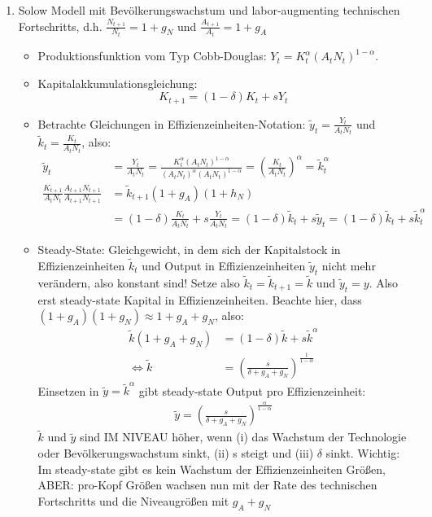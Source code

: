 \documentclass{scrartcl}
\begin{document}
\begin{enumerate}
\item Solow Modell mit Bev\"{o}lkerungswachstum und labor-augmenting technischen Fortschritts, d.h. $\frac{N_{t+1}}{N_t} = 1+g_N$ und $\frac{A_{t+1}}{A_t} = 1+g_A$
\begin{itemize}
  \item Produktionsfunktion vom Typ Cobb-Douglas: $Y_t = K_t^\alpha \left(A_tN_t\right)^{1-\alpha}$.
  \item Kapitalakkumulationsgleichung: $$K_{t+1}=(1-\delta)K_t + s Y_t$$
  \item Betrachte Gleichungen in Effizienzeinheiten-Notation: $\tilde{y}_t = \frac{Y_t}{A_tN_t}$ und $\tilde{k}_t = \frac{K_t}{A_tN_t}$, also:
      \begin{align*}
        \tilde{y}_t &= \frac{Y_t}{A_tN_t} = \frac{K_t^\alpha (A_tN_t)^{1-\alpha}}{(A_tN_t)^\alpha (A_tN_t)^{1-\alpha}} = \left(\frac{K_t}{A_tN_t}\right)^\alpha = \tilde{k}_t^\alpha\\
        \frac{K_{t+1}}{A_{t}N_{t}} \frac{A_{t+1}N_{t+1}}{A_{t+1}N_{t+1}} &= \tilde{k}_{t+1}(1+g_A)(1+h_N)\\ &= (1-\delta)\frac{K_t}{A_{t}N_{t}} + s \frac{Y_t}{A_{t}N_{t}} = (1-\delta)\tilde{k}_t + s \tilde{y}_t = (1-\delta)\tilde{k}_t + s \tilde{k}_t^\alpha
      \end{align*}
  \item Steady-State: Gleichgewicht, in dem sich der Kapitalstock in Effizienzeinheiten $\tilde{k}_t$ und Output in Effizienzeinheiten $\tilde{y}_t$ nicht mehr ver\"{a}ndern, also konstant sind! Setze also $\tilde{k}_t=\tilde{k}_{t+1}=\tilde{k}$ und $\tilde{y}_t=y$. Also erst steady-state Kapital in Effizienzeinheiten. Beachte hier, dass $(1+g_A)(1+g_N) \approx 1+g_A+g_N$, also:
      \begin{align*}
      \tilde{k}(1+g_A+g_N) &= (1-\delta)\tilde{k} + s\tilde{k}^\alpha\\
      \Leftrightarrow \tilde{k} & = \left(\frac{s}{\delta+g_A+g_N}\right)^{\frac{1}{1-\alpha}}
      \end{align*}
      Einsetzen in $\tilde{y} = \tilde{k}^\alpha$ gibt steady-state Output pro Effizienzeinheit:
      \begin{align*}
        \tilde{y} = \left(\frac{s}{\delta+g_A+g_N}\right)^{\frac{\alpha}{1-\alpha}}
      \end{align*}
      $\tilde{k}$ und $\tilde{y}$ sind IM NIVEAU h\"{o}her, wenn (i) das Wachstum der Technologie oder Bev\"{o}lkerungswachstum sinkt, (ii) s steigt und (iii) $\delta$ sinkt. Wichtig: Im steady-state gibt es kein Wachstum der Effizienzeinheiten Gr\"{o}{\ss}en, ABER: pro-Kopf Gr\"{o}{\ss}en wachsen nun mit der Rate des technischen Fortschritts und die Niveaugr\"{o}{\ss}en mit $g_A+g_N$\\

\end{itemize}
\end{enumerate}
\end{document}
